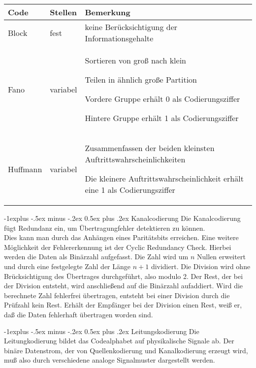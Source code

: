 \documentclass[10pt,landscape]{article}
\makeatletter
\renewcommand{\subsection}{\@startsection{subsection}{2}{0mm}%
                                {-1explus -.5ex minus -.2ex}%
                                {0.5ex plus .2ex}%
                                {\normalfont\normalsize\bfseries}}
\makeatother
\begin{document}
\begin{multicols}{3}
    \begin{tabular}{ l | l | p{5cm} }
        Code     & Stellen  & Bemerkung                                      \\\hline
        Block    & fest     & keine Berücksichtigung der Informationsgehalte \\
        Fano     & variabel & 
        \begin{itemize*}
            \item Sortieren von groß nach klein
            \item Teilen in ähnlich große Partition
            \item Vordere Gruppe erhält 0 als Codierungsziffer
            \item Hintere Gruppe erhält 1 als Codierungsziffer
        \end{itemize*}                                       \\
        Huffmann & variabel & 
        \begin{itemize*}
            \item Zusammenfassen der beiden kleinsten Auftrittswahrscheinlichkeiten
            \item Die kleinere Auftrittswahrscheinlichkeit erhält eine 1 als Codierungsziffer
        \end{itemize*}
    \end{tabular}
    
    \subsection{Kanalcodierung}
    Die Kanalcodierung fügt Redundanz ein, um Übertragungfehler detektieren zu können.\\
    Dies kann man durch das Anhängen eines Paritätsbits erreichen.
    Eine weitere Möglichkeit der Fehlererkennung ist der Cyclic Redundancy Check. Hierbei werden die Daten als Binärzahl aufgefasst. Die Zahl wird um $n$ Nullen erweitert und durch eine festgelegte Zahl der Länge $n + 1$ dividiert. Die Division wird ohne Brücksichtigung des Übertrages durchgeführt, also modulo 2. Der Rest, der bei der Division entsteht, wird anschließend auf die Binärzahl aufaddiert. Wird die berechnete Zahl fehlerfrei übertragen, entsteht bei einer Division durch die Prüfzahl kein Rest. Erhält der Empfänger bei der Division einen Rest, weiß er, daß die Daten fehlerhaft übertragen worden sind.
    
    \subsection{Leitungskodierung}
    Die Leitungkodierung bildet das Codealphabet auf physikalische Signale ab. Der binäre Datenstrom, der von Quellenkodierung und Kanalkodierung erzeugt wird, muß also durch verschiedene analoge Signalmuster dargestellt werden.
    

\end{multicols}
\end{document}
